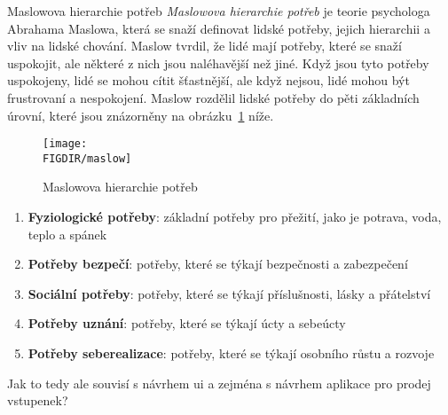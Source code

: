 \begin{subsection}{Maslowova hierarchie potřeb}
    \label{subsec:navrh-uzivatelskeho-rozhrani-psychologie-maslow}
    \textit{Maslowova hierarchie potřeb} je teorie psychologa Abrahama Maslowa, která se snaží definovat lidské potřeby, jejich hierarchii a vliv na lidské chování.
    Maslow tvrdil, že lidé mají potřeby, které se snaží uspokojit, ale některé z nich jsou naléhavější než jiné.
    Když jsou tyto potřeby uspokojeny, lidé se mohou cítit šťastnější, ale když nejsou, lidé mohou být frustrovaní a nespokojení.\cite{maslow_motivace_osobnost}
    Maslow rozdělil lidské potřeby do pěti základních úrovní, které jsou znázorněny na obrázku~\ref{fig:maslow} níže.

    \begin{figure}[H]
        \centering
        \caption{Maslowova hierarchie potřeb}
        \texttt{[image: \\FIGDIR/maslow]}
        \label{fig:maslow}
    \end{figure}

    \begin{enumerate}
        \item \textbf{Fyziologické potřeby}: základní potřeby pro přežití, jako je potrava, voda, teplo a spánek
        \item \textbf{Potřeby bezpečí}: potřeby, které se týkají bezpečnosti a zabezpečení
        \item \textbf{Sociální potřeby}: potřeby, které se týkají příslušnosti, lásky a přátelství
        \item \textbf{Potřeby uznání}: potřeby, které se týkají úcty a sebeúcty
        \item \textbf{Potřeby seberealizace}: potřeby, které se týkají osobního růstu a rozvoje
    \end{enumerate}

    Jak to tedy ale souvisí s návrhem \ac{ui} a zejména s návrhem aplikace pro prodej vstupenek?
\end{subsection}

